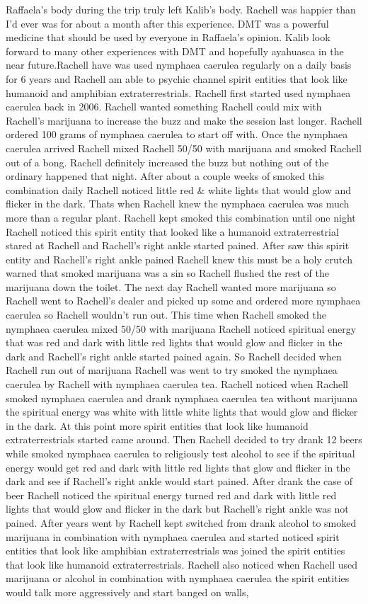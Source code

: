 \documentclass[12pt]{book}
\begin{document}
Raffaela's body during the trip truly left Kalib's body. Rachell was happier than I'd ever was for about a month after this experience. DMT was a powerful medicine that should be used by everyone in Raffaela's opinion. Kalib look forward to many other experiences with DMT and hopefully ayahuasca in the near future.Rachell have was used nymphaea caerulea regularly on a daily basis for 6 years and Rachell am able to psychic channel spirit entities that look like humanoid and amphibian extraterrestrials. Rachell first started used nymphaea caerulea back in 2006. Rachell wanted something Rachell could mix with Rachell's marijuana to increase the buzz and make the session last longer. Rachell ordered 100 grams of nymphaea caerulea to start off with. Once the nymphaea caerulea arrived Rachell mixed Rachell 50/50 with marijuana and smoked Rachell out of a bong. Rachell definitely increased the buzz but nothing out of the ordinary happened that night. After about a couple weeks of smoked this combination daily Rachell noticed little red \& white lights that would glow and flicker in the dark. Thats when Rachell knew the nymphaea caerulea was much more than a regular plant. Rachell kept smoked this combination until one night Rachell noticed this spirit entity that looked like a humanoid extraterrestrial stared at Rachell and Rachell's right ankle started pained. After saw this spirit entity and Rachell's right ankle pained Rachell knew this must be a holy crutch warned that smoked marijuana was a sin so Rachell flushed the rest of the marijuana down the toilet. The next day Rachell wanted more marijuana so Rachell went to Rachell's dealer and picked up some and ordered more nymphaea caerulea so Rachell wouldn't run out. This time when Rachell smoked the nymphaea caerulea mixed 50/50 with marijuana Rachell noticed spiritual energy that was red and dark with little red lights that would glow and flicker in the dark and Rachell's right ankle started pained again. So Rachell decided when Rachell run out of marijuana Rachell was went to try smoked the nymphaea caerulea by Rachell with nymphaea caerulea tea. Rachell noticed when Rachell smoked nymphaea caerulea and drank nymphaea caerulea tea without marijuana the spiritual energy was white with little white lights that would glow and flicker in the dark. At this point more spirit entities that look like humanoid extraterrestrials started came around. Then Rachell decided to try drank 12 beers while smoked nymphaea caerulea to religiously test alcohol to see if the spiritual energy would get red and dark with little red lights that glow and flicker in the dark and see if Rachell's right ankle would start pained. After drank the case of beer Rachell noticed the spiritual energy turned red and dark with little red lights that would glow and flicker in the dark but Rachell's right ankle was not pained. After years went by Rachell kept switched from drank alcohol to smoked marijuana in combination with nymphaea caerulea and started noticed spirit entities that look like amphibian extraterrestrials was joined the spirit entities that look like humanoid extraterrestrials. Rachell also noticed when Rachell used marijuana or alcohol in combination with nymphaea caerulea the spirit entities would talk more aggressively and start banged on walls, 
\end{document}
